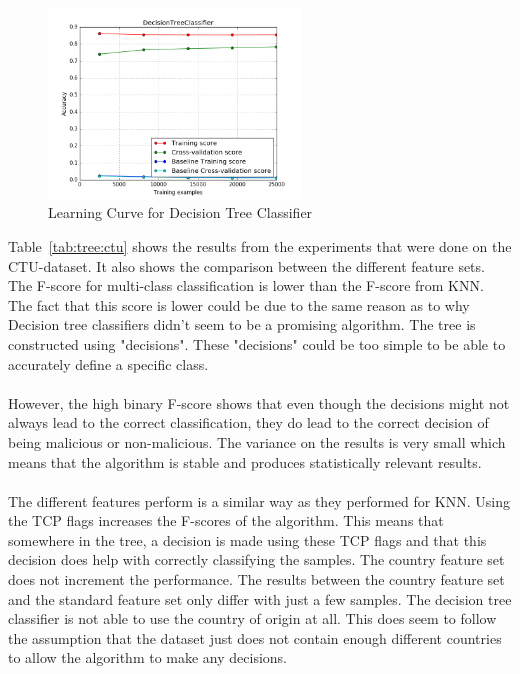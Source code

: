  \begin{figure}[H]
\centering
\includegraphics[width=0.6\textwidth]{Figures/Plot_DecisionTreeClassifier}
\decoRule
\caption[Learning Curve for Decision Tree Classifier]{Learning Curve for Decision Tree Classifier}
\label{fig:tree}
\end{figure}

\noindent Table~\ref{tab:tree:ctu} shows the results from the experiments that were done on the CTU-dataset. It also shows the comparison between the different feature sets. The F-score for multi-class classification is lower than the F-score from KNN. The fact that this score is lower could be due to the same reason as to why Decision tree classifiers didn't seem to be a promising algorithm. The tree is constructed using "decisions". These "decisions" could be too simple to be able to accurately define a specific class. \\
\\
However, the high binary F-score shows that even though the decisions might not always lead to the correct classification, they do lead to the correct decision of being malicious or non-malicious. The variance on the results is very small which means that the algorithm is stable and produces statistically relevant results. \\
\\
The different features perform is a similar way as they performed for KNN. Using the TCP flags increases the F-scores of the algorithm. This means that somewhere in the tree, a decision is made using these TCP flags and that this decision does help with correctly classifying the samples. The country feature set does not increment the performance. The results between the country feature set and the standard feature set only differ with just a few samples. The decision tree classifier is not able to use the country of origin at all. This does seem to follow the assumption that the dataset just does not contain enough different countries to allow the algorithm to make any decisions.

